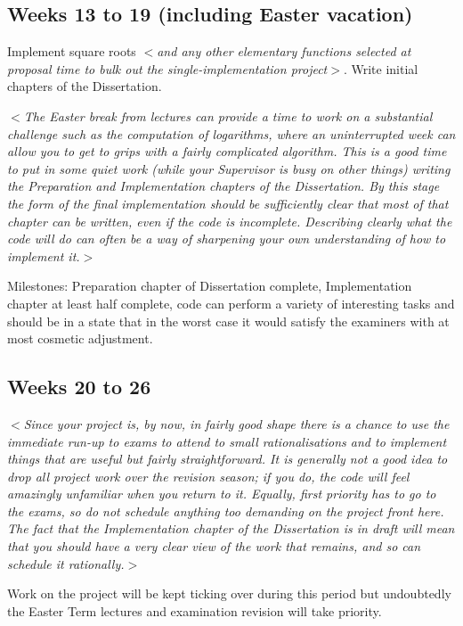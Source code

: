 \documentclass[12pt]{article}
\newcommand{\al}{$<$}
\newcommand{\ar}{$>$}
\begin{document}
\subsection*{Weeks 13 to 19 (including Easter vacation)}

Implement square roots \al\emph{and any other elementary functions
  selected at proposal time to bulk out the single-implementation
  project}\ar.  Write initial chapters of the Dissertation.

\al\emph{The Easter break from lectures can provide a time to work on
  a substantial challenge such as the computation of logarithms, where
  an uninterrupted week can allow you to get to grips with a fairly
  complicated algorithm.  This is a good time to put in some quiet
  work (while your Supervisor is busy on other things) writing the
  Preparation and Implementation chapters of the Dissertation.  By
  this stage the form of the final implementation should be
  sufficiently clear that most of that chapter can be written, even if
  the code is incomplete.  Describing clearly what the code will do
  can often be a way of sharpening your own understanding of how to
  implement it.}\ar

Milestones: Preparation chapter of Dissertation complete,
Implementation chapter at least half complete, code can perform a
variety of interesting tasks and should be in a state that in the
worst case it would satisfy the examiners with at most cosmetic
adjustment.


\subsection*{Weeks 20 to 26}

\al\emph{Since your project is, by now, in fairly good shape there is
  a chance to use the immediate run-up to exams to attend to small
  rationalisations and to implement things that are useful but fairly
  straightforward.  It is generally not a good idea to drop all
  project work over the revision season; if you do, the code will feel
  amazingly unfamiliar when you return to it.  Equally, first priority
  has to go to the exams, so do not schedule anything too demanding on
  the project front here.  The fact that the Implementation chapter of
  the Dissertation is in draft will mean that you should have a very
  clear view of the work that remains, and so can schedule it
  rationally.}\ar

Work on the project will be kept ticking over during this period but
undoubtedly the Easter Term lectures and examination revision will
take priority.
\end{document}
